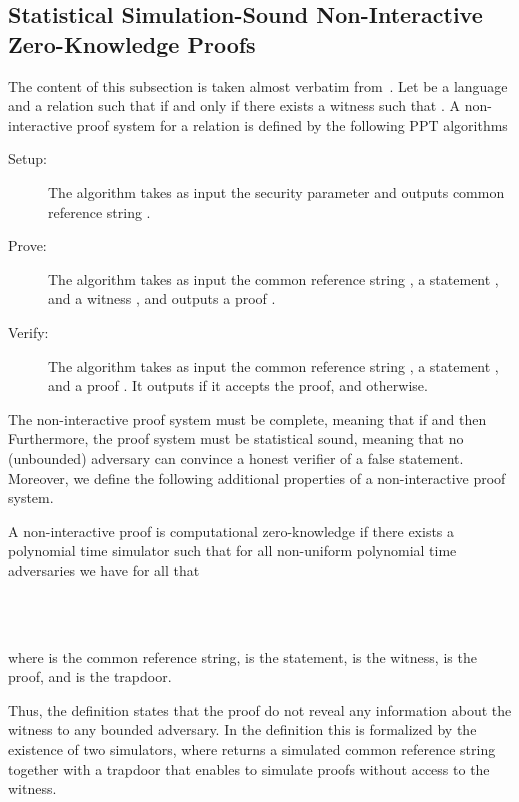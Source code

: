 \documentclass{llncs}
\begin{document}
\subsection{Statistical Simulation-Sound Non-Interactive Zero-Knowledge Proofs} \label{app:nizk_sss}
The content of this subsection is taken almost verbatim from~\cite{DBLP:conf/focs/GargGH0SW13}.
Let  be a language and  a relation such that  if and only if there exists a witness  such that .
A non-interactive proof system \cite{DBLP:conf/stoc/BlumFM88} for a relation  is defined by the following PPT algorithms
\begin{description}
\item[Setup:] The  algorithm takes as input the security parameter  and outputs common reference string .

\item[Prove:] The  algorithm takes as input the common reference string , a statement , and a witness , and outputs a proof .

\item[Verify:] The  algorithm takes as input the common reference string , a statement , and a proof . It outputs  if it accepts the proof, and  otherwise.
\end{description}

The non-interactive proof system must be complete, meaning that if   and  then   
Furthermore, the proof system must be statistical sound, meaning that no (unbounded) adversary can convince a honest verifier of a false statement.
Moreover, we define the following additional properties of a non-interactive proof system.


\begin{defi}A non-interactive proof  is computational zero-knowledge if there exists a polynomial time simulator  such that for all non-uniform polynomial time adversaries  we have for all  that
	\begin{center}
		\\
		 \\
				
	\end{center}
where  is the common reference string,  is the statement,  is the witness,  is the proof, and  is the trapdoor.
\end{defi}

Thus, the definition states that the proof do not reveal any information about the witness to any bounded adversary.
In the definition this is formalized by the existence of two simulators, where  returns a simulated common reference string together with a trapdoor that enables  to simulate proofs without access to the witness.
\end{document}
